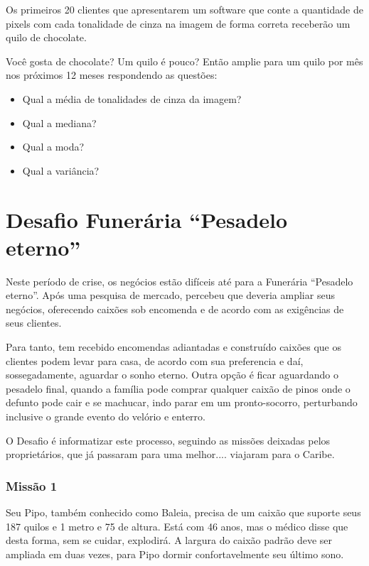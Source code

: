 \documentclass[
	12pt,				%
	oneside,			%
	a4paper,			%
	english,			%
	french,				%
	spanish,			%
	brazil,				%
	]{abntex2}
\begin{document}
\begin{apendicesenv}
Os primeiros 20 clientes que apresentarem um software que conte a quantidade de pixels com cada tonalidade de cinza na imagem de forma correta receberão um quilo de chocolate.

Você gosta de chocolate? Um quilo é pouco? Então amplie para um quilo por mês nos próximos 12 meses respondendo as questões:

\begin{itemize}
  \item Qual a média de tonalidades de cinza da imagem?
  \item Qual a mediana?
  \item Qual a moda?
  \item Qual a variância?
\end{itemize}

\chapter{Desafio Funerária “Pesadelo eterno”}
\label{apen:transformacaoGeometrica}

Neste período de crise, os negócios estão difíceis até para a Funerária “Pesadelo eterno”. Após uma pesquisa de mercado, percebeu que deveria ampliar seus negócios, oferecendo caixões sob encomenda e de acordo com as exigências de seus clientes.

Para tanto, tem recebido encomendas adiantadas e construído caixões que os clientes podem levar para casa, de acordo com sua preferencia e daí, sossegadamente, aguardar o sonho eterno. Outra opção é ficar aguardando o pesadelo final, quando a família pode comprar qualquer caixão de pinos onde o defunto pode cair e se machucar, indo parar em um pronto-socorro, perturbando inclusive o grande evento do velório e enterro.

O Desafio é informatizar este processo, seguindo as missões deixadas pelos proprietários, que já passaram para uma melhor.... viajaram para o Caribe.

\subsection{Missão 1}

Seu Pipo, também conhecido como Baleia, precisa de um caixão que suporte seus 187 quilos e 1 metro e 75 de altura. Está com 46 anos, mas o médico disse que desta forma, sem se cuidar, explodirá. A largura do caixão padrão deve ser ampliada em duas vezes, para Pipo dormir confortavelmente seu último sono.


\end{apendicesenv}
\end{document}
